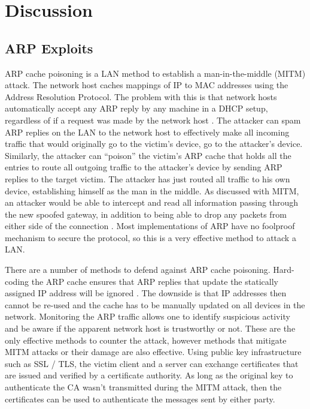 \documentclass[journal]{IEEEtran}
\begin{document}
\section{Discussion}

\subsection{ARP Exploits}
ARP cache poisoning is a LAN method to establish a man-in-the-middle (MITM) attack. The network host caches mappings of IP to MAC addresses using the Address Resolution Protocol. The problem with this is that network hosts automatically accept any ARP reply by any machine in a DHCP setup, regardless of if a request was made by the network host \cite{MITM}. The attacker can spam ARP replies on the LAN to the network host to effectively make all incoming traffic that would originally go to the victim's device, go to the attacker's device. Similarly, the attacker can “poison” the victim's ARP cache that holds all the entries to route all outgoing traffic to the attacker's device by sending ARP replies to the target victim. The attacker has just routed all traffic to his own device, establishing himself as the man in the middle. As discussed with MITM, an attacker would be able to intercept and read all information passing through the new spoofed gateway, in addition to being able to drop any packets from either side of the connection \cite{MITM}. Most implementations of ARP have no foolproof mechanism to secure the protocol, so this is a very effective method to attack a LAN.

There are a number of methods to defend against ARP cache poisoning. Hard-coding the ARP cache ensures that ARP replies that update the statically assigned IP address will be ignored \cite{SARP}. The downside is that IP addresses then cannot be re-used and the cache has to be manually updated on all devices in the network. Monitoring the ARP traffic allows one to identify suspicious activity and be aware if the apparent network host is trustworthy or not. These are the only effective methods to counter the attack, however methods that mitigate MITM attacks or their damage are also effective. Using public key infrastructure such as SSL / TLS, the victim client and a server can exchange certificates that are issued and verified by a certificate authority. As long as the original key to authenticate the CA wasn't transmitted during the MITM attack, then the certificates can be used to authenticate the messages sent by either party.
\end{document}
